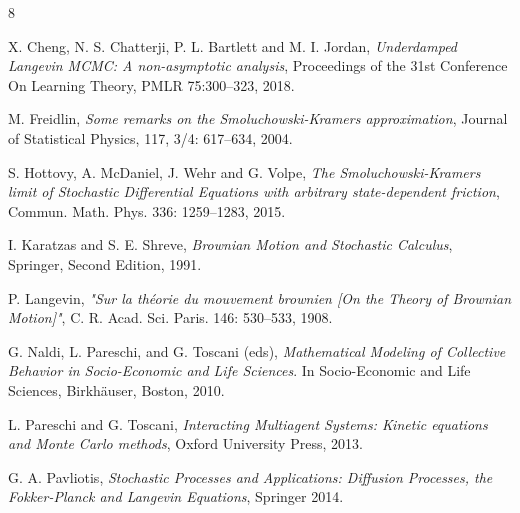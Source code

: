\documentclass[11pt]{article}
\theoremstyle{remark}
\begin{document}
\begin{thebibliography}{8}

X. Cheng, N. S. Chatterji, P. L. Bartlett and M. I. Jordan,
\textit{Underdamped Langevin MCMC: A non-asymptotic analysis},
Proceedings of the 31st Conference On Learning Theory,
PMLR 75:300--323, 2018.

M. Freidlin,
\textit{Some remarks on the Smoluchowski-Kramers approximation},
Journal of Statistical Physics, 117, 3/4: 617--634, 2004.

S. Hottovy, A. McDaniel, J. Wehr and G. Volpe,
\textit{The Smoluchowski-Kramers limit of Stochastic Differential Equations with arbitrary state-dependent friction},
Commun. Math. Phys. 336: 1259--1283, 2015.

I. Karatzas and S. E. Shreve,
\textit{Brownian Motion and Stochastic Calculus},
Springer, Second Edition, 1991.

P. Langevin,
\textit{"Sur la théorie du mouvement brownien [On the Theory of Brownian Motion]"},
C. R. Acad. Sci. Paris. 146: 530--533, 1908.

G. Naldi, L. Pareschi, and G. Toscani (eds),
\textit{Mathematical Modeling of Collective Behavior in Socio-Economic and Life Sciences}.
In Socio-Economic and Life Sciences, Birkh\"auser, Boston, 2010.

L. Pareschi and G. Toscani,
\textit{Interacting Multiagent Systems: Kinetic equations and Monte Carlo methods},
Oxford University Press, 2013.

G. A. Pavliotis,
\textit{Stochastic Processes and Applications: Diffusion Processes, the Fokker-Planck and Langevin Equations},
Springer 2014.

\end{thebibliography}
\end{document}
